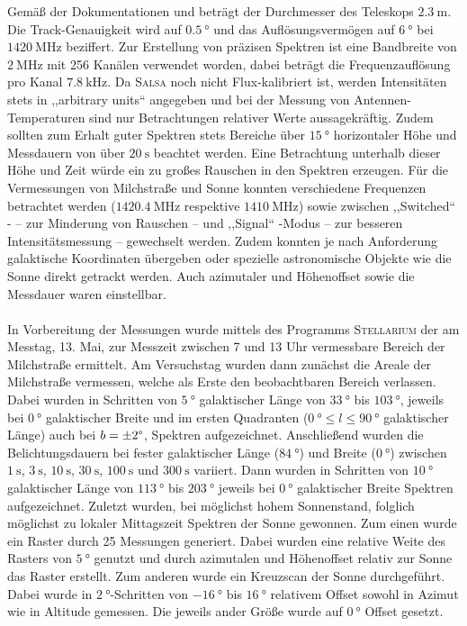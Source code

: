 Gemäß der Dokumentationen \cite{Usermanual} und \cite{AntennaResp} beträgt der Durchmesser des Teleskops $\SI{2.3}{\metre}$. Die Track-Genauigkeit wird auf $\SI{0.5}{\degree}$ und das Auflösungsvermögen auf $\SI{6}{\degree}$ bei $\SI{1420}{\mega \hertz}$ beziffert.
Zur Erstellung von präzisen Spektren ist eine Bandbreite von $\SI{2}{\mega \hertz}$ mit 256 Kanälen verwendet worden, dabei beträgt die Frequenzauflösung pro Kanal $\SI{7.8}{\kilo \hertz}$.
Da \textsc{Salsa} noch nicht Flux-kalibriert ist, werden Intensitäten stets in ,,arbitrary units`` angegeben und bei der Messung von Antennen-Temperaturen sind nur Betrachtungen relativer Werte aussagekräftig.
Zudem sollten zum Erhalt guter Spektren stets Bereiche über $\SI{15}{\degree}$ horizontaler Höhe und Messdauern von über $\SI{20}{\second}$ beachtet werden. Eine Betrachtung unterhalb dieser Höhe und Zeit würde ein zu großes Rauschen in den Spektren erzeugen.
Für die Vermessungen von Milchstraße und Sonne konnten verschiedene Frequenzen betrachtet werden ($\SI{1420.4}{\mega \hertz}$ respektive $\SI{1410}{\mega \hertz}$) sowie zwischen  ,,Switched`` - -- zur Minderung von Rauschen --  und ,,Signal`` -Modus -- zur besseren Intensitätsmessung -- gewechselt werden.
Zudem konnten je nach Anforderung galaktische Koordinaten übergeben oder spezielle astronomische Objekte wie die Sonne direkt getrackt werden.
Auch azimutaler und Höhenoffset sowie die Messdauer waren einstellbar.\\ 
\\ 
In Vorbereitung der Messungen wurde mittels des Programms \textsc{Stellarium} der am Messtag, 13. Mai, zur Messzeit zwischen 7 und 13 Uhr vermessbare Bereich der Milchstraße ermittelt.
Am Versuchstag wurden dann zunächst die Areale der Milchstraße vermessen, welche als Erste den beobachtbaren Bereich verlassen.
Dabei wurden in Schritten von $\SI{5}{\degree}$ galaktischer Länge von $\SI{33}{\degree}$ bis $\SI{103}{\degree}$, jeweils bei $\SI{0}{\degree}$ galaktischer Breite und im ersten Quadranten ($\SI{0}{\degree} \le l \le \SI{90}{\degree}$ galaktischer Länge) auch bei $b=\pm \si{2}{\degree}$, Spektren aufgezeichnet.
Anschließend wurden die Belichtungsdauern bei fester galaktischer Länge ($\SI{84}{\degree}$) und Breite ($\SI{0}{\degree}$) zwischen $\SI{1}{\second}$, $\SI{3}{\second}$, $\SI{10}{\second}$, $\SI{30}{\second}$, $\SI{100}{\second}$ und $\SI{300}{\second}$ variiert.
Dann wurden in Schritten von $\SI{10}{\degree}$ galaktischer Länge von $\SI{113}{\degree}$ bis $\SI{203}{\degree}$ jeweils bei $\SI{0}{\degree}$ galaktischer Breite Spektren aufgezeichnet.
Zuletzt wurden, bei möglichst hohem Sonnenstand, folglich möglichst zu lokaler Mittagszeit Spektren der Sonne gewonnen.
Zum einen wurde ein Raster durch 25 Messungen generiert.
Dabei wurden eine relative Weite des Rasters von $\SI{5}{\degree}$ genutzt und durch azimutalen und Höhenoffset relativ zur Sonne das Raster erstellt.
Zum anderen wurde ein Kreuzscan der Sonne durchgeführt.
Dabei wurde in $\SI{2}{\degree}$-Schritten von $\SI{-16}{\degree}$ bis $\SI{16}{\degree}$ relativem Offset sowohl in Azimut wie in Altitude gemessen. Die jeweils ander Größe wurde auf $\SI{0}{\degree}$ Offset gesetzt.